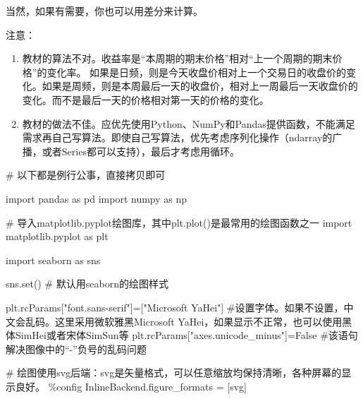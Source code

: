 \documentclass[
  letterpaper,
  DIV=11,
  numbers=noendperiod]{scrreprt}
\newenvironment{Shaded}{\begin{snugshade}}{\end{snugshade}}
\newcommand{\BuiltInTok}[1]{\textcolor[rgb]{0.00,0.23,0.31}{#1}}
\newcommand{\CommentTok}[1]{\textcolor[rgb]{0.37,0.37,0.37}{#1}}
\newcommand{\ImportTok}[1]{\textcolor[rgb]{0.00,0.46,0.62}{#1}}
\newcommand{\NormalTok}[1]{\textcolor[rgb]{0.00,0.23,0.31}{#1}}
\newcommand{\OperatorTok}[1]{\textcolor[rgb]{0.37,0.37,0.37}{#1}}
\newcommand{\StringTok}[1]{\textcolor[rgb]{0.13,0.47,0.30}{#1}}
\newcommand{\VariableTok}[1]{\textcolor[rgb]{0.07,0.07,0.07}{#1}}
\begin{document}
当然，如果有需要，你也可以用差分来计算。

注意：

\begin{enumerate}
\def\labelenumi{\arabic{enumi}.}
\item
  教材的算法不对。收益率是``本周期的期末价格''相对``上一个周期的期末价格''的变化率。
  如果是日频，则是今天收盘价相对上一个交易日的收盘价的变化。如果是周频，则是本周最后一天的收盘价，相对上一周最后一天收盘价的变化。而不是最后一天的价格相对第一天的价格的变化。
\item
  教材的做法不佳。应优先使用Python、NumPy和Pandas提供函数，不能满足需求再自己写算法。即使自己写算法，优先考虑序列化操作（ndarray的广播，或者Series都可以支持），最后才考虑用循环。
\end{enumerate}

\begin{Shaded}
\begin{Highlighting}[]
\CommentTok{\# 以下都是例行公事，直接拷贝即可}

\ImportTok{import}\NormalTok{ pandas }\ImportTok{as}\NormalTok{ pd}
\ImportTok{import}\NormalTok{ numpy }\ImportTok{as}\NormalTok{ np }

\CommentTok{\# 导入matplotlib.pyplot绘图库，其中plt.plot()是最常用的绘图函数之一}
\ImportTok{import}\NormalTok{ matplotlib.pyplot }\ImportTok{as}\NormalTok{ plt }

\ImportTok{import}\NormalTok{ seaborn }\ImportTok{as}\NormalTok{ sns}

\NormalTok{sns.}\BuiltInTok{set}\NormalTok{() }\CommentTok{\# 默认用seaborn的绘图样式}

\NormalTok{plt.rcParams[}\StringTok{"font.sans{-}serif"}\NormalTok{]}\OperatorTok{=}\NormalTok{[}\StringTok{"Microsoft YaHei"}\NormalTok{] }\CommentTok{\#设置字体。如果不设置，中文会乱码。这里采用微软雅黑\textquotesingle{}Microsoft YaHei\textquotesingle{}，如果显示不正常，也可以使用黑体\textquotesingle{}SimHei\textquotesingle{}或者宋体\textquotesingle{}SimSun\textquotesingle{}等}
\NormalTok{plt.rcParams[}\StringTok{"axes.unicode\_minus"}\NormalTok{]}\OperatorTok{=}\VariableTok{False} \CommentTok{\#该语句解决图像中的“{-}”负号的乱码问题}

\CommentTok{\# 绘图使用\textquotesingle{}svg\textquotesingle{}后端：svg是矢量格式，可以任意缩放均保持清晰，各种屏幕的显示良好。}
\OperatorTok{\%}\NormalTok{config InlineBackend.figure\_formats }\OperatorTok{=}\NormalTok{ [}\StringTok{\textquotesingle{}svg\textquotesingle{}}\NormalTok{]}
\end{Highlighting}
\end{Shaded}
\end{document}
